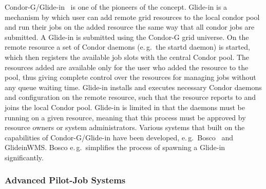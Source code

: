 \documentclass{sig-alternate}
\begin{document}
Condor-G/Glide-in~\cite{condor-g} is one of the pioneers of the \pilotjob
concept. Glide-in is a mechanism by which user can add remote grid resources
to the local condor pool and run their jobs on the added resource the same way
that all condor jobs are submitted. A Glide-in is submitted using the Condor-G
grid universe. On the remote resource a set of Condor daemons (e.\,g.\ the
startd daemon) is started, which then registers the available job slots with
the central Condor pool. The resources added are available only for the user
who added the resource to the pool, thus giving complete control over the
resources for managing jobs without any queue waiting time. Glide-in installs
and executes necessary Condor daemons and configuration on the remote
resource, such that the resource reports to and joins the local Condor pool.
Glide-in is limited in that the daemons must be running on a given resource,
meaning that this process must be approved by resource owners or system
administrators. Various systems that built on the \pilot capabilities of 
Condor-G/Glide-in have been developed, e.\,g.\ Bosco~\cite{bosco} and 
GlideinWMS. Bosco e.\,g.\ simplifies the process of spawning a Glide-in 
significantly.






\subsubsection{Advanced Pilot-Job Systems}


\end{document}
